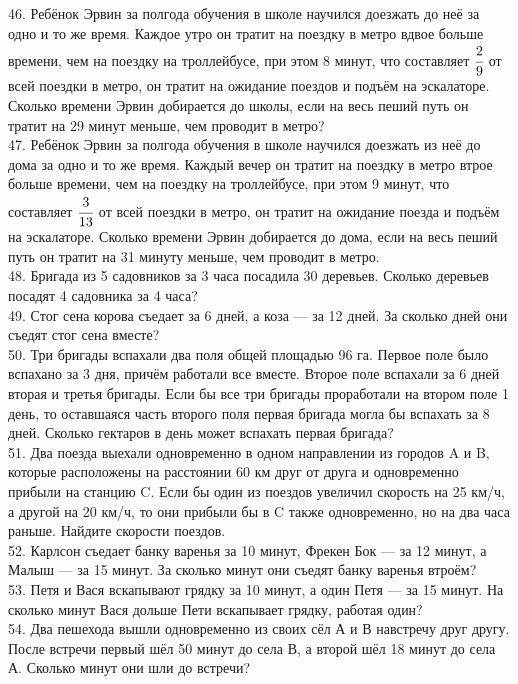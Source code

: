 \documentclass[12pt]{article}
\begin{document}
46. Ребёнок Эрвин за полгода обучения в школе научился доезжать до неё за одно и то же время. Каждое утро он тратит на поездку в метро вдвое больше времени, чем на поездку на троллейбусе, при этом 8 минут, что составляет $\cfrac{2}{9}$ от всей поездки в метро, он тратит на ожидание поездов и подъём на эскалаторе. Сколько времени Эрвин добирается до школы, если на весь пеший путь он тратит на 29 минут меньше, чем проводит в метро?\\
47. Ребёнок Эрвин за полгода обучения в школе научился доезжать из неё до дома за одно и то же время. Каждый вечер он тратит на поездку в метро втрое больше времени, чем на поездку на троллейбусе, при этом 9 минут, что составляет $\cfrac{3}{13}$ от всей поездки в метро, он тратит на ожидание поезда и подъём на эскалаторе. Сколько времени Эрвин добирается до дома, если на весь пеший путь он тратит на 31 минуту меньше, чем проводит в метро.\\
48. Бригада из 5 садовников за 3 часа посадила 30 деревьев. Сколько деревьев посадят 4 садовника за 4 часа?\\
49. Стог сена корова съедает за 6 дней, а коза --- за 12 дней. За сколько дней они съедят стог сена вместе?\\
50. Три бригады вспахали два поля общей площадью 96 га. Первое поле было вспахано за 3 дня, причём работали все вместе. Второе поле вспахали за 6 дней вторая и третья бригады. Если бы все три бригады проработали на втором поле 1 день, то оставшаяся часть второго поля первая бригада могла бы вспахать за 8 дней. Сколько гектаров в день может вспахать первая бригада?\\
51. Два поезда выехали одновременно в одном направлении из городов A и B, которые расположены на расстоянии 60 км друг от друга и одновременно прибыли на станцию C. Если бы один из поездов увеличил скорость на 25 км/ч, а другой на 20 км/ч, то они прибыли бы в C также одновременно, но на два часа раньше. Найдите скорости поездов.\\
52. Карлсон съедает банку варенья за 10 минут, Фрекен Бок --- за 12 минут, а Малыш --- за 15 минут. За сколько минут они съедят банку варенья втроём?\\
53. Петя и Вася вскапывают грядку за 10 минут, а один Петя --- за 15 минут. На сколько минут Вася дольше Пети вскапывает грядку, работая один?\\
54. Два пешехода вышли одновременно из своих сёл А и В навстречу друг другу. После встречи первый шёл 50 минут до села В, а второй шёл 18 минут до села А. Сколько минут они шли до встречи?\\
\end{document}
